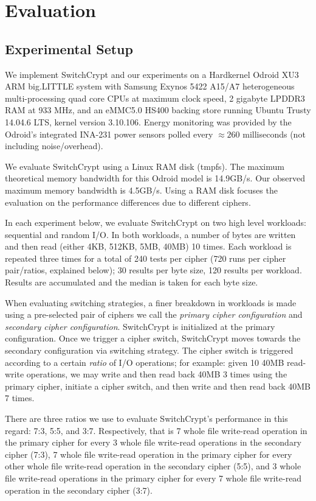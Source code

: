 \section{Evaluation} \label{sec:evaluation}

\subsection{Experimental Setup}

We implement SwitchCrypt and our experiments on a Hardkernel Odroid XU3 ARM
big.LITTLE system with Samsung Exynos 5422 A15/A7 heterogeneous multi-processing
quad core CPUs at maximum clock speed, 2 gigabyte LPDDR3 RAM at 933 MHz, and an
eMMC5.0 HS400 backing store running Ubuntu Trusty 14.04.6 LTS, kernel version
3.10.106. Energy monitoring was provided by the Odroid's integrated INA-231
power sensors polled every $\approx{260}$ milliseconds (not including
noise/overhead).

We evaluate SwitchCrypt using a Linux RAM disk (tmpfs). The maximum theoretical
memory bandwidth for this Odroid model is 14.9GB/s\@. Our observed maximum
memory bandwidth is 4.5GB/s. Using a RAM disk focuses the evaluation on the
performance differences due to different ciphers.

In each experiment below, we evaluate SwitchCrypt on two high level workloads:
sequential and random I/O. In both workloads, a number of bytes are written and
then read (either 4KB, 512KB, 5MB, 40MB) 10 times. Each workload is repeated
three times for a total of 240 tests per cipher (720 runs per cipher
pair/ratios, explained below); 30 results per byte size, 120 results per
workload. Results are accumulated and the median is taken for each byte size.

When evaluating switching strategies, a finer breakdown in workloads is made
using a pre-selected pair of ciphers we call the \emph{primary cipher
configuration} and \emph{secondary cipher configuration}. SwitchCrypt is
initialized at the primary configuration. Once we trigger a cipher switch,
SwitchCrypt moves towards the secondary configuration via switching strategy.
The cipher switch is triggered according to a certain \emph{ratio} of I/O
operations; for example: given 10 40MB read-write operations, we may write and
then read back 40MB 3 times using the primary cipher, initiate a cipher switch,
and then write and then read back 40MB 7 times.

There are three ratios we use to evaluate SwitchCrypt's performance in this
regard: 7:3, 5:5, and 3:7. Respectively, that is 7 whole file write-read
operation in the primary cipher for every 3 whole file write-read operations in
the secondary cipher (7:3), 7 whole file write-read operation in the primary
cipher for every other whole file write-read operation in the secondary cipher
(5:5), and 3 whole file write-read operations in the primary cipher for every 7
whole file write-read operation in the secondary cipher (3:7).

